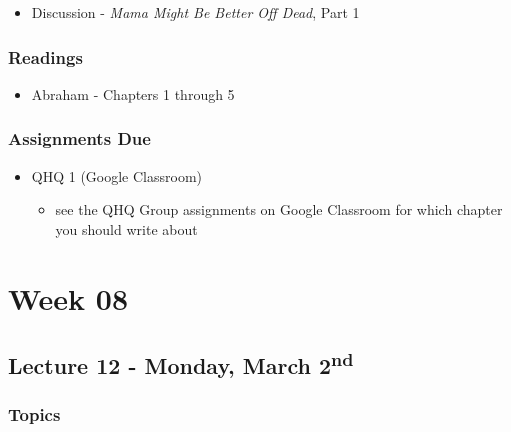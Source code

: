 \documentclass[]{book}
\providecommand{\tightlist}{%
  \setlength{\itemsep}{0pt}\setlength{\parskip}{0pt}}
\begin{document}
\begin{itemize}
\tightlist
\item
  Discussion - \emph{Mama Might Be Better Off Dead}, Part 1
\end{itemize}

\hypertarget{readings-12}{%
\subsubsection*{Readings}\label{readings-12}}

\begin{itemize}
\tightlist
\item
  Abraham - Chapters 1 through 5
\end{itemize}

\hypertarget{assignments-due-2}{%
\subsubsection*{Assignments Due}\label{assignments-due-2}}

\begin{itemize}
\tightlist
\item
  QHQ 1 (Google Classroom)

  \begin{itemize}
  \tightlist
  \item
    see the QHQ Group assignments on Google Classroom for which chapter you should write about
  \end{itemize}
\end{itemize}

\newpage

\hypertarget{week-08}{%
\section*{Week 08}\label{week-08}}

\hypertarget{lecture-12---monday-march-2nd}{%
\subsection*{\texorpdfstring{Lecture 12 - Monday, March 2\textsuperscript{nd}}{Lecture 12 - Monday, March 2nd}}\label{lecture-12---monday-march-2nd}}

\hypertarget{topics-14}{%
\subsubsection*{Topics}\label{topics-14}}
\end{document}
